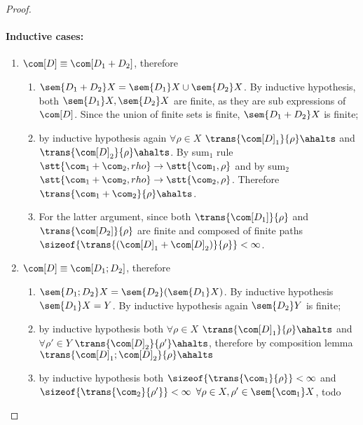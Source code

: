 \begin{proof}
  \paragraph*{Inductive cases:\\}
  \begin{enumerate}
  \item \(\com[D]\equiv \com[D_1 + D_2]\), therefore
    \begin{enumerate}[label=(\roman*).]
    \item \(\sem{D_1 + D_2} X = \sem{D_1}X \cup \sem{D_2}X\). By
      inductive hypothesis, both \(\sem{D_1}X, \sem{D_2}X\) are
      finite, as they are sub expressions of \(\com[D]\). Since the
      union of finite sets is finite, \(\sem{D_1 + D_2}X\) is finite;
    \item by inductive hypothesis again \(\forall \rho \in X\)
      \(\trans{\com[D]_1}{\rho}\ahalts\) and
      \(\trans{\com[D]_2}{\rho}\ahalts\). By sum\(_1\) rule
      \(\stt{\com_1 + \com_2, rho} \to \stt{\com_1, \rho}\) and by
      sum\(_2\) \(\stt{\com_1 + \com_2, rho} \to \stt{\com_2,
        \rho}\). Therefore \(\trans{\com_1 + \com_2}{\rho}\ahalts\).
    \item For the latter argument, since both
      \(\trans{\com[D_1]}{\rho}\) and \(\trans{\com[D_2]}{\rho}\) are
      finite and composed of finite paths
      \(\sizeof{\trans{(\com[D]_1 + \com[D]_2)}{\rho}} < \infty\).
    \end{enumerate}
  \item \(\com[D]\equiv \com[D_1; D_2]\), therefore
    \begin{enumerate}[label=(\roman*).]
    \item \(\sem{D_1;D_2}X = \sem{D_2}(\sem{D_1}X)\). By inductive
      hypothesis \(\sem{D_1}X = Y\). By inductive hypothesis again
      \(\sem{D_2}Y\) is finite;
    \item by inductive hypothesis both \(\forall \rho \in X\)
      \(\trans{\com[D]_1}{\rho}\ahalts\) and \(\forall \rho' \in Y\)
      \(\trans{\com[D]_2}{\rho'}\ahalts\), therefore by composition
      lemma \(\trans{\com[D]_1;\com[D]_2}{\rho} \ahalts\)
    \item by inductive hypothesis both
      \(\sizeof{\trans{\com_1}{\rho}} < \infty\) and
      \(\sizeof{\trans{\com_2}{\rho'}} < \infty\)
      \(\forall \rho \in X, \rho'\in \sem{\com_1}X\), todo
    \end{enumerate}
  \end{enumerate}
\end{proof}

